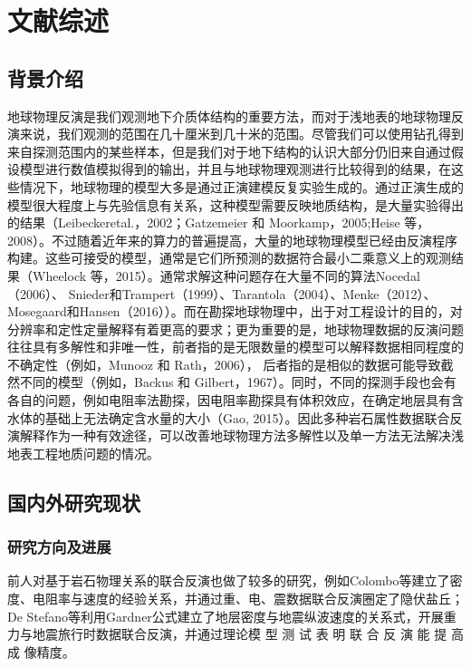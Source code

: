 \cleardoublepage
\newrefsection
\chapter{文献综述}

\section{背景介绍}

地球物理反演是我们观测地下介质体结构的重要方法，而对于浅地表的地球物理反演来说，我们观测的范围在几十厘米到几十米的范围。尽管我们可以使用钻孔得到来自探测范围内的某些样本，但是我们对于地下结构的认识大部分仍旧来自通过假设模型进行数值模拟得到的输出，并且与地球物理观测进行比较得到的结果，在这些情况下，地球物理的模型大多是通过正演建模反复实验生成的。通过正演生成的模型很大程度上与先验信息有关系，这种模型需要反映地质结构，是大量实验得出的结果（Leibeckeretal.，2002；Gatzemeier 和 Moorkamp，2005;Heise 等，2008）。不过随着近年来的算力的普遍提高，大量的地球物理模型已经由反演程序构建。这些可接受的模型，通常是它们所预测的数据符合最小二乘意义上的观测结果（Wheelock 等，2015）。通常求解这种问题存在大量不同的算法Nocedal（2006）、 Snieder和Trampert（1999）、Tarantola（2004）、Menke（2012）、Mosegaard和Hansen（2016））。而在勘探地球物理中，出于对工程设计的目的，对分辨率和定性定量解释有着更高的要求；更为重要的是，地球物理数据的反演问题往往具有多解性和非唯一性，前者指的是无限数量的模型可以解释数据相同程度的不确定性（例如，Munooz 和 Rath，2006）， 后者指的是相似的数据可能导致截然不同的模型（例如，Backus 和 Gilbert，1967）。同时，不同的探测手段也会有各自的问题，例如电阻率法勘探，因电阻率勘探具有体积效应，在确定地层具有含水体的基础上无法确定含水量的大小（Gao, 2015）。因此多种岩石属性数据联合反演解释作为一种有效途径，可以改善地球物理方法多解性以及单一方法无法解决浅地表工程地质问题的情况。
\newpage
\section{国内外研究现状}

\subsection{研究方向及进展}

前人对基于岩石物理关系的联合反演也做了较多的研究，例如Colombo等建立了密度、电阻率与速度的经验关系，并通过重、电、震数据联合反演圈定了隐伏盐丘；De Stefano等利用Gardner公式建立了地层密度与地震纵波速度的关系式，开展重力与地震旅行时数据联合反演，并通过理论模 型 测 试 表 明 联 合 反 演 能 提 高 成 像精度。

